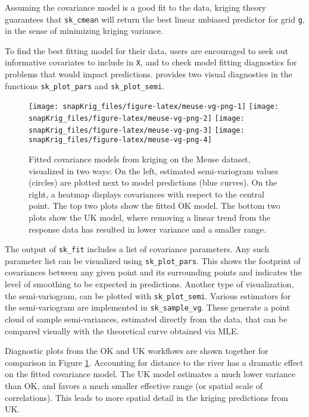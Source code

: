 Assuming the covariance model is a good fit to the data, kriging theory guarantees that \texttt{sk\_cmean} will return the best linear unbiased predictor for grid \texttt{g}, in the sense of minimizing kriging variance.

To find the best fitting model for their data, users are encouraged to seek out informative covariates to include in \texttt{X}, and to check model fitting diagnostics for problems that would impact predictions.  provides two visual diagnostics in the functions \texttt{sk\_plot\_pars} and \texttt{sk\_plot\_semi}.

\begin{figure}[!htb]
\texttt{[image: snapKrig\_files/figure-latex/meuse-vg-png-1]} \texttt{[image: snapKrig\_files/figure-latex/meuse-vg-png-2]} \texttt{[image: snapKrig\_files/figure-latex/meuse-vg-png-3]} \texttt{[image: snapKrig\_files/figure-latex/meuse-vg-png-4]} \caption{Fitted covariance models from kriging on the Meuse dataset, visualized in two ways: On the left, estimated semi-variogram values (circles) are plotted next to model predictions (blue curves). On the right, a heatmap displays covariances with respect to the central point. The top two plots show the fitted OK model. The bottom two plots show the UK model, where removing a linear trend from the response data has resulted in lower variance and a smaller range.}\label{fig:meuse-vg-png}
\end{figure}

The output of \texttt{sk\_fit} includes a list of covariance parameters. Any such parameter list can be visualized using \texttt{sk\_plot\_pars}. This shows the footprint of covariances between any given point and its surrounding points and indicates the level of smoothing to be expected in predictions. Another type of visualization, the semi-variogram, can be plotted with \texttt{sk\_plot\_semi}. Various estimators for the semi-variogram are implemented in \texttt{sk\_sample\_vg}. These generate a point cloud of sample semi-variances, estimated directly from the data, that can be compared visually with the theoretical curve obtained via MLE.

Diagnostic plots from the OK and UK workflows are shown together for comparison in Figure \ref{fig:meuse-vg-png}. Accounting for distance to the river has a dramatic effect on the fitted covariance model. The UK model estimates a much lower variance than OK, and favors a much smaller effective range (or spatial scale of correlations). This leads to more spatial detail in the kriging predictions from UK.

